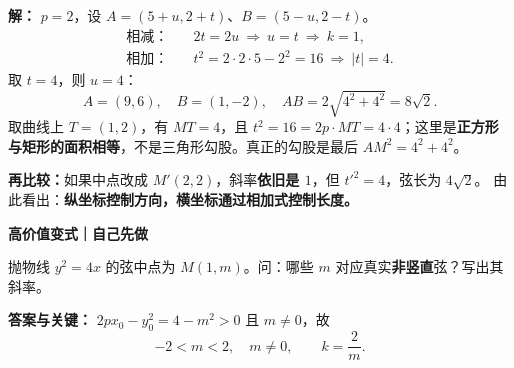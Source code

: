\begin{examplebox}
\begin{minipage}{\linewidth}
\par
\end{minipage}
\par\smallskip
\par\noindent\textbf{解：} $p=2$，设 $A=(5+u,2+t)$、$B=(5-u,2-t)$。
\[
\begin{aligned}
\text{相减：}&\quad 2t=2u\ \Longrightarrow\ u=t\ \Longrightarrow\ k=1,\\
\text{相加：}&\quad t^2=2\cdot2\cdot5-2^2=16
 \ \Longrightarrow\ |t|=4.
\end{aligned}
\]
取 $t=4$，则 $u=4$：
\[
\boxed{A=(9,6),\quad B=(1,-2),\quad AB=2\sqrt{4^2+4^2}=8\sqrt2}.
\]
取曲线上 $T=(1,2)$，有 $MT=4$，且 $t^2=16=2p\cdot MT=4\cdot4$；这里是\textbf{正方形与矩形的面积相等}，不是三角形勾股。真正的勾股是最后 $AM^2=4^2+4^2$。

\par\noindent\textbf{再比较：}如果中点改成 $M'(2,2)$，斜率\textbf{依旧是 $1$}，但 $t'^2=4$，弦长为 $4\sqrt2$。
由此看出：\textbf{纵坐标控制方向，横坐标通过相加式控制长度。}
\par\medskip
\begin{minipage}{\linewidth}
\noindent
\textbf{\textcolor{CExample}{高价值变式｜自己先做}}\par\nobreak\smallskip
抛物线 $y^2=4x$ 的弦中点为 $M(1,m)$。问：哪些 $m$ 对应真实\textbf{非竖直}弦？写出其斜率。\par
\end{minipage}
\par

\par\noindent\textbf{答案与关键：} $2px_0-y_0^2=4-m^2>0$ 且 $m\ne0$，故
\[\boxed{-2<m<2,\quad m\ne0,\qquad k=\frac{2}{m}}.\]
\end{examplebox}
